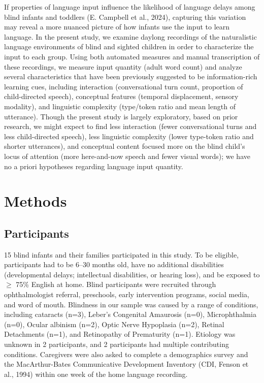 \documentclass[
  man]{apa6}
\begin{document}
If properties of language input influence the likelihood of language delays among blind infants and toddlers (E. Campbell et al., 2024), capturing this variation may reveal a more nuanced picture of how infants use the input to learn language. In the present study, we examine daylong recordings of the naturalistic language environments of blind and sighted children in order to characterize the input to each group. Using both automated measures and manual transcription of these recordings, we measure input quantity (adult word count) and analyze several characteristics that have been previously suggested to be information-rich learning cues, including interaction (conversational turn count, proportion of child-directed speech), conceptual features (temporal displacement, sensory modality), and linguistic complexity (type/token ratio and mean length of utterance). Though the present study is largely exploratory, based on prior research, we might expect to find less interaction (fewer conversational turns and less child-directed speech), less linguistic complexity (lower type-token ratio and shorter utterances), and conceptual content focused more on the blind child's locus of attention (more here-and-now speech and fewer visual words); we have no a priori hypotheses regarding language input quantity.

\hypertarget{methods}{%
\section{Methods}\label{methods}}

\hypertarget{participants}{%
\subsection{Participants}\label{participants}}

15 blind infants and their families participated in this study. To be eligible, participants had to be 6--30 months old, have no additional disabilities (developmental delays; intellectual disabilities, or hearing loss), and be exposed to \(\geq\) 75\% English at home. Blind participants were recruited through ophthalmologist referral, preschools, early intervention programs, social media, and word of mouth. Blindness in our sample was caused by a range of conditions, including cataracts (n=3), Leber's Congenital Amaurosis (n=0), Microphthalmia (n=0), Ocular albinism (n=2), Optic Nerve Hypoplasia (n=2), Retinal Detachments (n=1), and Retinopathy of Prematurity (n=1). Etiology was unknown in 2 participants, and 2 participants had multiple contributing conditions. Caregivers were also asked to complete a demographics survey and the MacArthur-Bates Communicative Development Inventory (CDI, Fenson et al., 1994) within one week of the home language recording.
\end{document}
